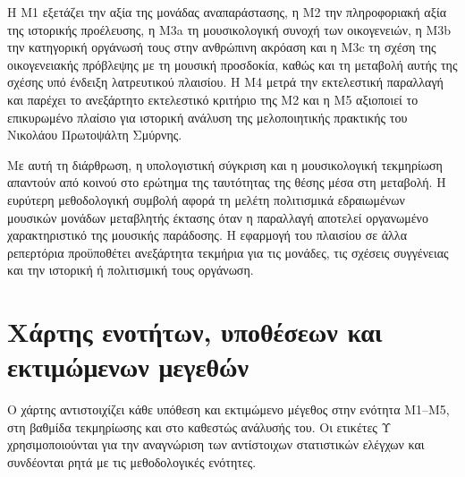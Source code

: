 \documentclass[11pt,a4paper]{article}
\begin{document}
Η M1 εξετάζει την αξία της μονάδας αναπαράστασης, η M2 την πληροφοριακή αξία της ιστορικής προέλευσης, η M3a τη μουσικολογική συνοχή των οικογενειών, η M3b την κατηγορική οργάνωσή τους στην ανθρώπινη ακρόαση και η M3c τη σχέση της οικογενειακής πρόβλεψης με τη μουσική προσδοκία, καθώς και τη μεταβολή αυτής της σχέσης υπό ένδειξη λατρευτικού πλαισίου. Η M4 μετρά την εκτελεστική παραλλαγή και παρέχει το ανεξάρτητο εκτελεστικό κριτήριο της M2 και η M5 αξιοποιεί το επικυρωμένο πλαίσιο για ιστορική ανάλυση της μελοποιητικής πρακτικής του Νικολάου Πρωτοψάλτη Σμύρνης.

Με αυτή τη διάρθρωση, η υπολογιστική σύγκριση και η μουσικολογική τεκμηρίωση απαντούν από κοινού στο ερώτημα της ταυτότητας της θέσης μέσα στη μεταβολή. Η ευρύτερη μεθοδολογική συμβολή αφορά τη μελέτη πολιτισμικά εδραιωμένων μουσικών μονάδων μεταβλητής έκτασης όταν η παραλλαγή αποτελεί οργανωμένο χαρακτηριστικό της μουσικής παράδοσης. Η εφαρμογή του πλαισίου σε άλλα ρεπερτόρια προϋποθέτει ανεξάρτητα τεκμήρια για τις μονάδες, τις σχέσεις συγγένειας και την ιστορική ή πολιτισμική τους οργάνωση.

\appendix
\newcommand{\LatinAppendixLetter}[1]{\ifcase#1\or A\or B\or C\or D\or E\or F\or G\or H\or I\or J\fi}
\renewcommand{\thesection}{\LatinAppendixLetter{\value{section}}}
\renewcommand{\thesubsection}{\thesection.\arabic{subsection}}
\renewcommand{\thesubsubsection}{\thesubsection.\arabic{subsubsection}}

\section{Χάρτης ενοτήτων, υποθέσεων και εκτιμώμενων μεγεθών}\label{app:estimand-map}

Ο χάρτης αντιστοιχίζει κάθε υπόθεση και εκτιμώμενο μέγεθος στην ενότητα M1--M5, στη βαθμίδα τεκμηρίωσης και στο καθεστώς ανάλυσής του. Οι ετικέτες Υ χρησιμοποιούνται για την αναγνώριση των αντίστοιχων στατιστικών ελέγχων και συνδέονται ρητά με τις μεθοδολογικές ενότητες.
\end{document}
